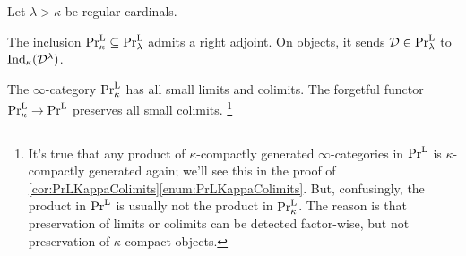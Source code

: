 \begin{cor}\label{cor:PrLKappaColimits}
	Let $\lambda >\kappa$ be regular cardinals.
	\begin{alphanumerate}
		\item The inclusion $\mathrm{Pr}_\kappa^{\mathrm{L}}\subseteq \mathrm{Pr}_\lambda^{\mathrm{L}}$ admits a right adjoint. On objects, it sends $\mathcal{D}\in\mathrm{Pr}_\lambda^{\mathrm{L}}$ to $\mathrm{Ind}_\kappa(\mathcal{D}^\lambda)$.\label{enum:PrLKappaLambda}
		\item The $\infty$-category $\mathrm{Pr}_\kappa^{\mathrm{L}}$ has all small limits and colimits. The forgetful functor $\mathrm{Pr}_\kappa^{\mathrm{L}}\rightarrow \mathrm{Pr}^{\mathrm{L}}$ preserves all small colimits.\label{enum:PrLKappaColimits}%
		\footnote{\label{footnote:ProductsInPrLKappa}It's true that any product of $\kappa$-compactly generated $\infty$-categories in $\mathrm{Pr}^{\mathrm{L}}$ is $\kappa$-compactly generated again; we'll see this in the proof of \cref{cor:PrLKappaColimits}\cref{enum:PrLKappaColimits}. But, confusingly, the product in $\mathrm{Pr}^{\mathrm{L}}$ is usually not the product in $\mathrm{Pr}_\kappa^{\mathrm{L}}$. The reason is that preservation of limits or colimits can be detected factor-wise, but not preservation of $\kappa$-compact objects.}
	\end{alphanumerate}
\end{cor}
